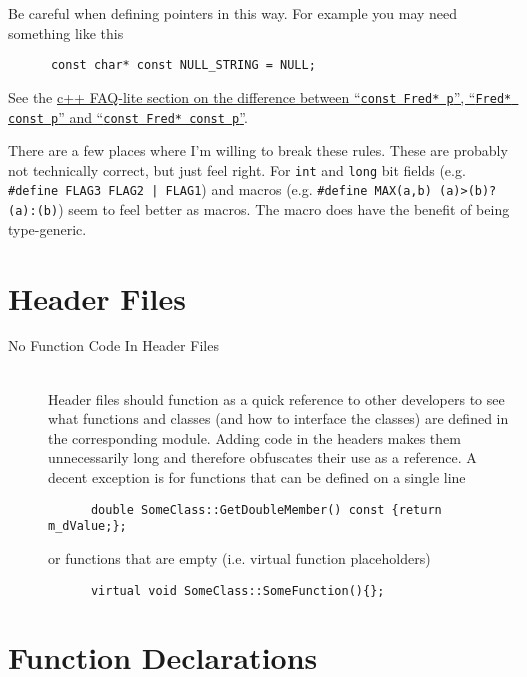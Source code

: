 \documentclass[11pt]{article}
\begin{document}
\begin{description}
    Be careful when defining pointers in this way.  For example you may need something like this
    \begin{lstlisting}
      const char* const NULL_STRING = NULL;
    \end{lstlisting}
    See the \href{http://www.parashift.com/c++-faq-lite/const-correctness.html#faq-18.5}{c++ FAQ-lite section on the difference between ``{\tt const Fred* p}'', ``{\tt Fred* const p}'' and ``{\tt const Fred* const p}''}.

    There are a few places where I'm willing to break these rules.  These are probably not technically correct, but just feel right.  For {\tt int} and {\tt long} bit fields (e.g. {\tt \#define FLAG3 FLAG2 | FLAG1}) and macros (e.g. {\tt \#define MAX(a,b) (a)>(b)?(a):(b)}) seem to feel better as macros.  The macro does have the benefit of being type-generic.   
\end{description}

\section{Header Files}

\begin{description}
  \item[No Function Code In Header Files] \hfill \\
    Header files should function as a quick reference to other developers to see what functions and classes (and how to interface the classes) are defined in the corresponding module.  Adding code in the headers makes them unnecessarily long and therefore obfuscates their use as a reference.  A decent exception is for functions that can be defined on a single line
    \begin{lstlisting}
      double SomeClass::GetDoubleMember() const {return m_dValue;};
    \end{lstlisting}
    or functions that are empty (i.e. virtual function placeholders)
    \begin{lstlisting}
      virtual void SomeClass::SomeFunction(){};
    \end{lstlisting}

\end{description}

\section{Function Declarations}
\end{document}
